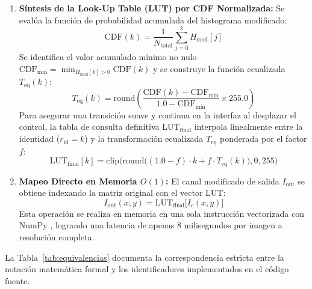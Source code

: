 \documentclass{article}
\begin{document}
\begin{enumerate}
    \item \textbf{Síntesis de la Look-Up Table (LUT) por CDF Normalizada:}
    Se evalúa la función de probabilidad acumulada del histograma modificado:
    \begin{equation}
        \text{CDF}(k) = \frac{1}{N_{\text{total}}} \sum_{j=0}^{k} H_{\text{mod}}[j]
    \end{equation}
    Se identifica el valor acumulado mínimo no nulo $\text{CDF}_{\min} = \min_{H_{\text{mod}}[k]>0} \text{CDF}(k)$ y se construye la función ecualizada $T_{\text{eq}}(k)$:
    \begin{equation}
        T_{\text{eq}}(k) = \text{round}\left( \frac{\text{CDF}(k) - \text{CDF}_{\min}}{1.0 - \text{CDF}_{\min}} \times 255.0 \right)
    \end{equation}
    Para asegurar una transición suave y continua en la interfaz al desplazar el control, la tabla de consulta definitiva $\text{LUT}_{\text{final}}$ interpola linealmente entre la identidad ($r_{\text{id}} = k$) y la transformación ecualizada $T_{\text{eq}}$ ponderada por el factor $f$:
    \begin{equation}
        \label{eq:lut}
        \text{LUT}_{\text{final}}[k] = \text{clip}\Big( \text{round}\big( (1.0 - f) \cdot k + f \cdot T_{\text{eq}}(k) \big), 0, 255 \Big)
    \end{equation}

    \item \textbf{Mapeo Directo en Memoria $O(1)$:}
    El canal modificado de salida $I_{\text{out}}$ se obtiene indexando la matriz original con el vector LUT:
    \begin{equation}
        I_{\text{out}}(x, y) = \text{LUT}_{\text{final}}\big[I_c(x, y)\big]
    \end{equation}
    Esta operación se realiza en memoria en una sola instrucción vectorizada con NumPy \cite{harris2020array}, logrando una latencia de apenas $8$ milisegundos por imagen a resolución completa.
\end{enumerate}

La Tabla~\ref{tab:equivalencias} documenta la correspondencia estricta entre la notación matemática formal y los identificadores implementados en el código fuente.
\end{document}
